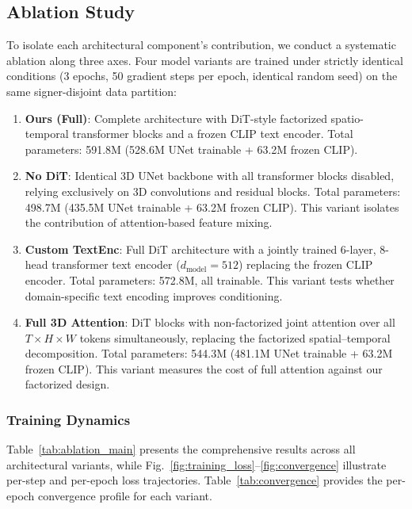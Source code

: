 \documentclass{ieeeaccess}
\begin{document}
\subsection{Ablation Study}
\label{sec:ablation}

To isolate each architectural component's contribution, we conduct a systematic ablation along three axes. Four model variants are trained under strictly identical conditions (3 epochs, 50 gradient steps per epoch, identical random seed) on the same signer-disjoint data partition:

\begin{enumerate}
    \item \textbf{Ours (Full)}: Complete architecture with DiT-style factorized spatio-temporal transformer blocks and a frozen CLIP text encoder. Total parameters: 591.8M (528.6M UNet trainable + 63.2M frozen CLIP).
    \item \textbf{No DiT}: Identical 3D UNet backbone with all transformer blocks disabled, relying exclusively on 3D convolutions and residual blocks. Total parameters: 498.7M (435.5M UNet trainable + 63.2M frozen CLIP). This variant isolates the contribution of attention-based feature mixing.
    \item \textbf{Custom TextEnc}: Full DiT architecture with a jointly trained 6-layer, 8-head transformer text encoder ($d_{\mathrm{model}}=512$) replacing the frozen CLIP encoder. Total parameters: 572.8M, all trainable. This variant tests whether domain-specific text encoding improves conditioning.
    \item \textbf{Full 3D Attention}: DiT blocks with non-factorized joint attention over all $T \times H \times W$ tokens simultaneously, replacing the factorized spatial--temporal decomposition. Total parameters: 544.3M (481.1M UNet trainable + 63.2M frozen CLIP). This variant measures the cost of full attention against our factorized design.
\end{enumerate}

\subsubsection{Training Dynamics}

Table~\ref{tab:ablation_main} presents the comprehensive results across all architectural variants, while Fig.~\ref{fig:training_loss}--\ref{fig:convergence} illustrate per-step and per-epoch loss trajectories. Table~\ref{tab:convergence} provides the per-epoch convergence profile for each variant.
\end{document}
